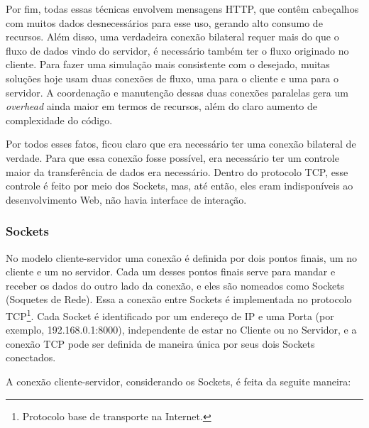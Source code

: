 \documentclass[a4paper,12pt]{article}
\begin{document}
Por fim, todas essas técnicas envolvem mensagens HTTP, que contêm cabeçalhos com muitos dados desnecessários para esse uso, gerando alto consumo de recursos. Além disso, uma verdadeira conexão bilateral requer mais do que o fluxo de dados vindo do servidor, é necessário também ter o fluxo originado no cliente. Para fazer uma simulação mais consistente com o desejado, muitas soluções hoje usam duas conexões de fluxo, uma para o cliente e uma para o servidor. A coordenação e manutenção dessas duas conexões paralelas gera um \emph{overhead} ainda maior em termos de recursos, além do claro aumento de complexidade do código.

Por todos esses fatos, ficou claro que era necessário ter uma conexão bilateral de verdade. Para que essa conexão fosse possível, era necessário ter um controle maior da transferência de dados era necessário. Dentro do protocolo TCP, esse controle é feito por meio dos Sockets, mas, até então, eles eram indisponíveis ao desenvolvimento Web, não havia interface de interação.


\subsubsection{Sockets}

No modelo cliente-servidor uma conexão é definida por dois pontos finais, um no cliente e um no servidor. Cada um desses pontos finais serve para mandar e receber os dados do outro lado da conexão, e eles são nomeados como Sockets (Soquetes de Rede). Essa a conexão entre Sockets é implementada no protocolo TCP\footnote{Protocolo base de transporte na Internet.}. Cada Socket é identificado por um endereço de IP e uma Porta (por exemplo, 192.168.0.1:8000), independente de estar no Cliente ou no Servidor, e a conexão TCP pode ser definida de maneira única por seus dois Sockets conectados.

A conexão cliente-servidor, considerando os Sockets, é feita da seguite maneira:
\end{document}
